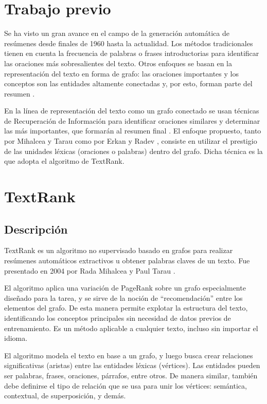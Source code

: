 \documentclass{llncs}
\begin{document}
\section{Trabajo previo}
Se ha visto un gran avance en el campo de la generación automática de resúmenes desde finales de 1960 hasta la actualidad. Los métodos tradicionales tienen en cuenta la frecuencia de palabras o frases introductorias para identificar las oraciones más sobresalientes del texto. Otros enfoques se basan en la representación del texto en forma de grafo: las oraciones importantes y los conceptos son las entidades altamente conectadas y, por esto, forman parte del resumen \cite{barzilay}. 

En la línea de representación del texto como un grafo conectado se usan técnicas de Recuperación de Información para identificar oraciones similares y determinar las más importantes, que formarán al resumen final \cite{salton}. El enfoque propuesto, tanto por Mihalcea y Tarau \cite{mihalcea-tarau} como por Erkan y Radev \cite{erkan}, consiste en utilizar el prestigio de las unidades léxicas (oraciones o palabras) dentro del grafo. Dicha técnica es la que adopta el algoritmo de TextRank.


\section{TextRank}

\subsection{Descripción}
TextRank es un algoritmo no supervisado basado en grafos para realizar resúmenes automáticos extractivos u obtener palabras claves de un texto. Fue presentado en 2004 por Rada Mihalcea y Paul Tarau \cite{mihalcea-tarau}.

El algoritmo aplica una variación de PageRank \cite{pageetal98} sobre un grafo especialmente diseñado para la tarea, y se sirve de la noción de “recomendación” entre los elementos del grafo. De esta manera permite explotar la estructura del texto, identificando los conceptos principales sin necesidad de datos previos de entrenamiento. Es un método aplicable a cualquier texto, incluso sin importar el idioma.

El algoritmo modela el texto en base a un grafo, y luego busca crear relaciones significativas (aristas) entre las entidades léxicas (vértices). Las entidades pueden ser palabras, frases, oraciones, párrafos, entre otros. De manera similar, también debe definirse el tipo de relación que se usa para unir los vértices: semántica, contextual, de superposición, y demás.
\end{document}
